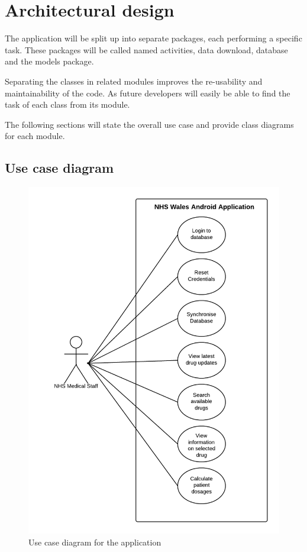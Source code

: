 \documentclass[11pt,fleqn,twoside]{article}
\begin{document}
\section{Architectural design}
The application will be split up into separate packages, each performing a specific task. These packages will be called named activities, data download, database and the models package.

Separating the classes in related modules improves the re-usability and maintainability of the code. As future developers will easily be able to find the task of each class from its module.

The following sections will state the overall use case and provide class diagrams for each module.
\newpage
\subsection{Use case diagram}

\begin{figure}[H]
\centering
\includegraphics[width=4.5in]{useCase}
\caption{Use case diagram for the application}
\end{figure}
\end{document}
